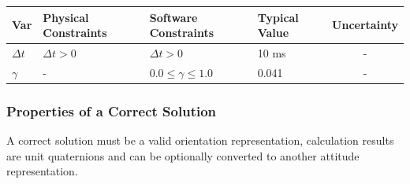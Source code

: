 \documentclass[12pt]{article}
\begin{document}

\begin{table}[!h]
  \caption{Input Variables} \label{TblInputVar}
  \renewcommand{\arraystretch}{1.2}
\noindent \begin{longtable*}{l l l l c}
\toprule
\textbf{Var} & \textbf{Physical Constraints} & \textbf{Software Constraints} & \textbf{Typical
Value} & \textbf{Uncertainty}\\
\midrule
    $\Delta t$ & $\Delta t > 0$ & $\Delta t > 0$ & 10 \si[per-mode=symbol] {\milli\second} & - \\
    $\gamma$ & - & $0.0 \leq \gamma \leq 1.0$ & 0.041 & - \\
\bottomrule
\end{longtable*}
\end{table}



\subsubsection{Properties of a Correct Solution} \label{sec_CorrectSolution}

\noindent
A correct solution must be a valid orientation representation, calculation results are unit
quaternions and can be optionally converted to another attitude representation.
\end{document}
